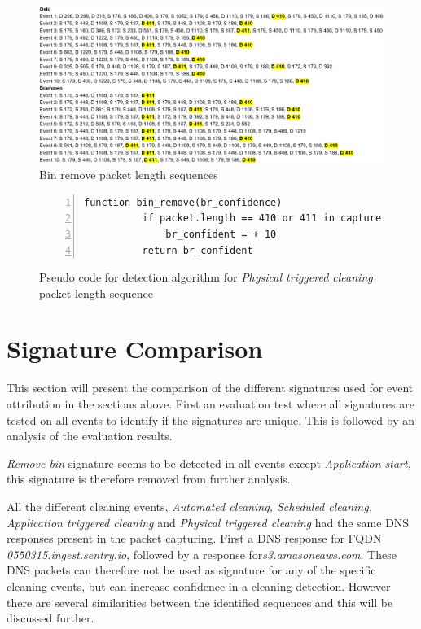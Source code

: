 \begin{figure}[H]
    \centering
    \includegraphics[width=\textwidth]{figures/Sequence_BR.png}
    \caption{Bin remove packet length sequences}
    \label{fig:BRseq}
\end{figure}

\begin{figure}[H]
    \centering
    \begin{lstlisting}[numbers=left]
     function bin_remove(br_confidence)
          if packet.length == 410 or 411 in capture.file
              br_confident = + 10
          return br_confident
    \end{lstlisting}
    \caption{Pseudo code for detection algorithm for \textit{Physical triggered cleaning} packet length sequence}
    \label{fig:Sudo_code_BinRemove}
\end{figure}

\section{Signature Comparison}
This section will present the comparison of the different signatures used for event attribution in the sections above. First an evaluation test where all signatures are tested on all events to identify if the signatures are unique. This is followed by an analysis of the evaluation results.

 \textit{Remove bin} signature seems to be detected in all events except \textit{Application start}, this signature is therefore removed from further analysis. 

All the different cleaning events, \textit{Automated cleaning, Scheduled cleaning, Application triggered cleaning} and \textit{Physical triggered cleaning} had the same \gls{DNS} responses present in the packet capturing. First a \gls{DNS} response for \gls{FQDN} \textit{0550315.ingest.sentry.io}, followed by a response for\textit{s3.amasoneaws.com}. These \gls{DNS} packets can therefore not be used as signature for any of the specific cleaning events, but can increase confidence in a cleaning detection. However there are several similarities between the identified sequences and this will be discussed further.

